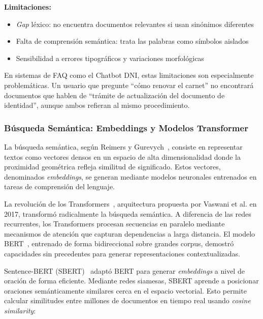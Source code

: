 \textbf{Limitaciones:}
\begin{itemize}
    \item \textit{Gap} l\'exico: no encuentra documentos relevantes si usan sin\'onimos diferentes
    \item Falta de comprensi\'on sem\'antica: trata las palabras como s\'imbolos aislados
    \item Sensibilidad a errores tipogr\'aficos y variaciones morfol\'ogicas
\end{itemize}

En sistemas de FAQ como el Chatbot DNI, estas limitaciones son especialmente problem\'aticas. Un usuario que pregunte ``c\'omo renovar el carnet'' no encontrar\'a documentos que hablen de ``tr\'amite de actualizaci\'on del documento de identidad'', aunque ambos refieran al mismo procedimiento.

\subsubsection{B\'usqueda Sem\'antica: Embeddings y Modelos Transformer}
\label{subsubsec:busqueda-semantica}

La b\'usqueda sem\'antica, seg\'un Reimers y Gurevych~\cite{reimers2019sbert}, consiste en representar textos como vectores densos en un espacio de alta dimensionalidad donde la proximidad geom\'etrica refleja similitud de significado. Estos vectores, denominados \textit{embeddings}, se generan mediante modelos neuronales entrenados en tareas de comprensi\'on del lenguaje.

La revoluci\'on de los Transformers~\cite{vaswani2017attention}, arquitectura propuesta por Vaswani et al. en 2017, transform\'o radicalmente la b\'usqueda sem\'antica. A diferencia de las redes recurrentes, los Transformers procesan secuencias en paralelo mediante mecanismos de atenci\'on que capturan dependencias a larga distancia. El modelo BERT~\cite{devlin2019bert}, entrenado de forma bidireccional sobre grandes corpus, demostr\'o capacidades sin precedentes para generar representaciones contextualizadas.

Sentence-BERT (SBERT)~\cite{reimers2019sbert} adapt\'o BERT para generar \textit{embeddings} a nivel de oraci\'on de forma eficiente. Mediante redes siamesas, SBERT aprende a posicionar oraciones sem\'anticamente similares cerca en el espacio vectorial. Esto permite calcular similitudes entre millones de documentos en tiempo real usando \textit{cosine similarity}:

